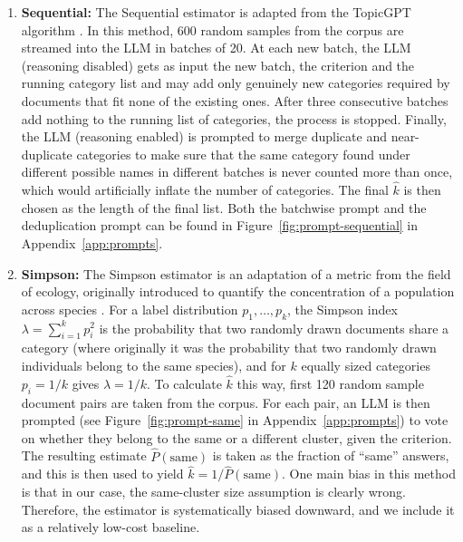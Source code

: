 \documentclass[11pt,a4paper,oneside]{report}
\begin{document}
\begin{enumerate}
From the pooled nine votes at each grid level, the share of ``no'' answers is calculated. This fraction represents the proportion of merges at that granularity the LLM considers ``unjustified''. This share is expected to be high at low $k$, where merges join unrelated categories, and low at high $k$, where merges join fragments of the same category.

Finally, a logistic curve of this fraction against $\log k$ is fitted and the final $\hat{k}$ is chosen to be the point where it crosses 50\% (which is then rounded and clipped to the nearest $k$ in the grid range). This $\hat{k}$ can therefore be thought of as the point between where the LLM believes the clustering is too granular and where it thinks it is not granular enough, which is by construction the point of optimal granularity.
\item \textbf{Sequential:} The Sequential estimator is adapted from the TopicGPT algorithm \citep{pham2024topicgpt}. In this method, 600 random samples from the corpus are streamed into the LLM in batches of 20. At each new batch, the LLM (reasoning disabled) gets as input the new batch, the criterion and the running category list and may add only genuinely new categories required by documents that fit none of the existing ones. After three consecutive batches add nothing to the running list of categories, the process is stopped. Finally, the LLM (reasoning enabled) is prompted to merge duplicate and near-duplicate categories to make sure that the same category found under different possible names in different batches is never counted more than once, which would artificially inflate the number of categories. The final $\hat{k}$ is then chosen as the length of the final list. Both the batchwise prompt and the deduplication prompt can be found in Figure~\ref{fig:prompt-sequential} in Appendix~\ref{app:prompts}.
\item \textbf{Simpson:} The Simpson estimator is an adaptation of a metric from the field of ecology, originally introduced to quantify the concentration of a population across species \citep{simpson1949measurement}. For a label distribution $p_1, \ldots, p_k$, the Simpson index $\lambda = \sum_{i=1}^{k} p_i^2$ is the probability that two randomly drawn documents share a category (where originally it was the probability that two randomly drawn individuals belong to the same species), and for $k$ equally sized categories $p_i = 1/k$ gives $\lambda = 1/k$. To calculate $\hat{k}$ this way, first 120 random sample document pairs are taken from the corpus. For each pair, an LLM is then prompted (see Figure~\ref{fig:prompt-same} in Appendix~\ref{app:prompts}) to vote on whether they belong to the same or a different cluster, given the criterion. The resulting estimate $\widehat{P}(\text{same})$ is taken as the fraction of ``same'' answers, and this is then used to yield $\hat{k} = 1/\widehat{P}(\text{same})$. One main bias in this method is that in our case, the same-cluster size assumption is clearly wrong. Therefore, the estimator is systematically biased downward, and we include it as a relatively low-cost baseline.

\end{enumerate}
\end{document}

